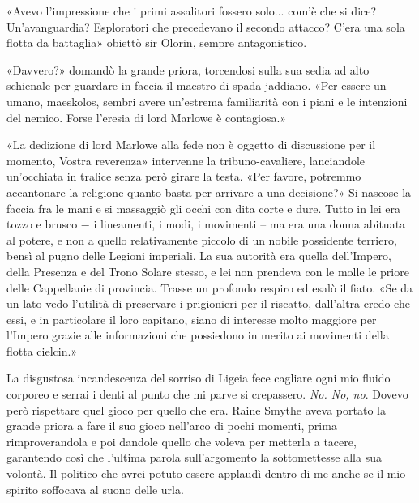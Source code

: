 «Avevo l'impressione che i primi assalitori fossero solo... com'è che si
dice? Un'avanguardia? Esploratori che precedevano il secondo attacco?
C'era una sola flotta da battaglia» obiettò sir Olorin, sempre
antagonistico.

«Davvero?» domandò la grande priora, torcendosi sulla sua sedia ad alto
schienale per guardare in faccia il maestro di spada jaddiano. «Per
essere un umano, maeskolos, sembri avere un'estrema familiarità con i
piani e le intenzioni del nemico. Forse l'eresia di lord Marlowe è
contagiosa.»

«La dedizione di lord Marlowe alla fede non è oggetto di discussione per
il momento, Vostra reverenza» intervenne la tribuno-cavaliere,
lanciandole un'occhiata in tralice senza però girare la testa. «Per
favore, potremmo accantonare la religione quanto basta per arrivare a
una decisione?» Si nascose la faccia fra le mani e si massaggiò gli
occhi con dita corte e dure. Tutto in lei era tozzo e brusco − i
lineamenti, i modi, i movimenti -- ma era una donna abituata al potere,
e non a quello relativamente piccolo di un nobile possidente terriero,
bensì al pugno delle Legioni imperiali. La sua autorità era quella
dell'Impero, della Presenza e del Trono Solare stesso, e lei non
prendeva con le molle le priore delle Cappellanie di provincia. Trasse
un profondo respiro ed esalò il fiato. «Se da un lato vedo l'utilità di
preservare i prigionieri per il riscatto, dall'altra credo che essi, e
in particolare il loro capitano, siano di interesse molto maggiore per
l'Impero grazie alle informazioni che possiedono in merito ai movimenti
della flotta cielcin.»

La disgustosa incandescenza del sorriso di Ligeia fece cagliare ogni mio
fluido corporeo e serrai i denti al punto che mi parve si crepassero.
\emph{No. No, no}. Dovevo però rispettare quel gioco per quello che era.
Raine Smythe aveva portato la grande priora a fare il suo gioco
nell'arco di pochi momenti, prima rimproverandola e poi dandole quello
che voleva per metterla a tacere, garantendo così che l'ultima parola
sull'argomento la sottomettesse alla sua volontà. Il politico che avrei
potuto essere applaudì dentro di me anche se il mio spirito soffocava al
suono delle urla.

